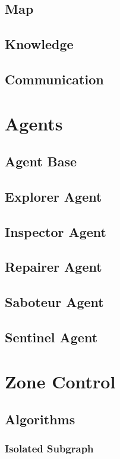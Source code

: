 \documentclass[11pt]{article}
\begin{document}
\subsection{Map}
\subsection{Knowledge}
\subsection{Communication}

\section{Agents}

\subsection{Agent Base}

\subsection{Explorer Agent}

\subsection{Inspector Agent}

\subsection{Repairer Agent}

\subsection{Saboteur Agent}

\subsection{Sentinel Agent}

\section{Zone Control}

\subsection{Algorithms}
\subsubsection{Isolated Subgraph}
\end{document}
